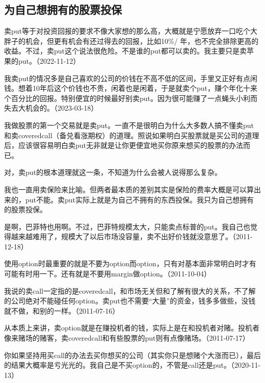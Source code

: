 \subsection{为自己想拥有的股票投保}

卖put等于对投资回报的要求不像大家想的那么高，大概就是宁愿放弃一口吃个大胖子的机会，但更有机会有还过得去的回报，比如10\%/ 年，也不完全排除更高的收益。不过，卖put这个说法很危险。不是谁的put都可以卖的。我主要只是卖苹果的put。（2022-11-12）

我卖put的情况多是自己喜欢的公司的价钱在不高不低的区间，手里又正好有点闲钱。想着10年后这个价钱也不贵，闲着也是闲着，于是就卖个put，赚个年化十来个百分比的回报。特别便宜的时候最好别卖put。因为很可能赚了一点蝇头小利而失去大机会的。（2023-03-18）

我做股票的第一个交易就是卖put。一直不是很明白为什么大多数人搞不懂卖put和卖coveredcall（备兑看涨期权）的道理。照说如果明白买股票就是买公司的道理后，应该很容易明白卖put无非就是让你更便宜地买你原来想买的股票的办法而已。


对，卖put的根本道理就这一条，不知道为什么会被人说得那么复杂。


我也一直用卖保险来比喻。但两者最本质的差别其实是保险的费率大概是可以算出来的，put不能。卖put实际上就是为自己不拥有的东西投保。我只为自己想拥有的股票投保。


是啊，巴菲特也用啊。不过，巴菲特规模太大，只能卖点标普的put。我自己也觉得越来越难用了，规模大了以后市场没容量，卖不出好价钱就没意思了。（2011-12-18）

使用option时最重要的就是不要为option而option，只有对基本面非常明白时才有可能有时用一下。还有就是不要用margin做option。（2011-10-04）

我说的卖call一定指的是coveredcall，和市场无关但和了解有很大的关系，不了解的公司绝对不能碰任何option。卖put也不需要“大量”的资金，钱多多做些，没钱就不做，和别的一样。（2011-07-16）

从本质上来讲，卖option就是在赚投机者的钱，实际上是在和投机者对赌。投机者像来赌场的赌客，卖coveredcall和有些股票的put则有点像赌场。（2011-07-17）

你如果坚持用买call的办法去买你想买的公司（其实你只是想赌个大涨而已），最后的结果大概率是亏光光的。我自己是不买option的，不管是call还是put。（2020-11-13）

